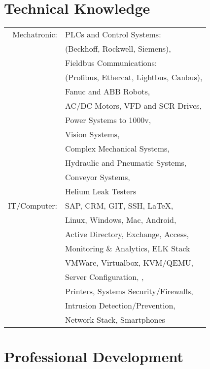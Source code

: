 \documentclass[10pt]{article} %
\begin{document}
\begin{minipage}[t]{0.44\textwidth}
\section{Technical Knowledge} 


\begin{tabular}{rl}
Mechatronic: & PLCs and Control Systems: \\ 
& (Beckhoff, Rockwell, Siemens), \\
& Fieldbus Communications: \\ 
& (Profibus, Ethercat, Lightbus, Canbus), \\
& Fanuc and ABB Robots, \\
& AC/DC Motors, VFD and SCR Drives,\\
& Power Systems to 1000v, \\
& Vision Systems, \\
& Complex Mechanical Systems, \\
& Hydraulic and Pneumatic Systems,  \\
& Conveyor Systems, \\
& Helium Leak Testers \\
IT/Computer: & SAP, CRM, GIT, SSH, \LaTeX, \\
& Linux, Windows, Mac, Android,\\
& Active Directory, Exchange, Access, \\
& Monitoring \& Analytics, ELK Stack \\ 
& VMWare, Virtualbox, KVM/QEMU,\\
& Server Configuration, ,\\
& Printers, Systems Security/Firewalls, \\
& Intrusion Detection/Prevention,\\
& Network Stack, Smartphones \\
\end{tabular}
\smallskip

\section{Professional Development} 


\end{minipage}
\end{document}
